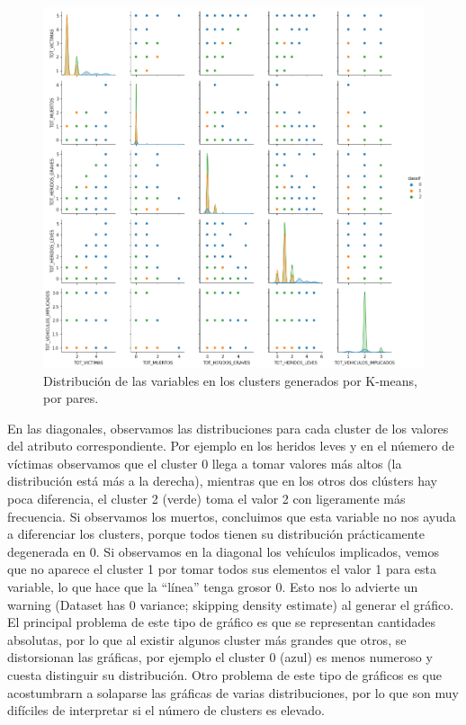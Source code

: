 \documentclass[oneside]{book}
\begin{document}
\begin{figure}[H]
  \centering
  \includegraphics[width=180mm]{figures/accidentes/k-means1pair}
  \caption{Distribución de las variables en los clusters generados por
    K-means, por pares.}
  \label{fig:k-means1pair}
\end{figure}

En las diagonales, observamos las distribuciones para cada cluster de
los valores del atributo correspondiente. Por ejemplo en los heridos
leves y en el núemero de víctimas observamos que el cluster 0 llega a
tomar valores más altos (la distribución está más a la derecha),
mientras que en los otros dos clústers hay poca diferencia, el cluster
2 (verde) toma el valor 2 con ligeramente más frecuencia. Si
observamos los muertos, concluimos que esta variable no nos ayuda a
diferenciar los clusters, porque todos tienen su distribución
prácticamente degenerada en 0. Si observamos en la diagonal los
vehículos implicados, vemos que no aparece el cluster 1 por tomar
todos sus elementos el valor 1 para esta variable, lo que hace que la
``línea'' tenga grosor 0. Esto nos lo advierte un warning (Dataset has
0 variance; skipping density estimate) al generar el gráfico. El
principal problema de este tipo de gráfico es que se representan
cantidades absolutas, por lo que al existir algunos cluster más
grandes que otros, se distorsionan las gráficas, por ejemplo el
cluster 0 (azul) es menos numeroso y cuesta distinguir su
distribución. Otro problema de este tipo de gráficos es que
acostumbrarn a solaparse las gráficas de varias distribuciones, por lo
que son muy difíciles de interpretar si el número de clusters es
elevado.
\end{document}
